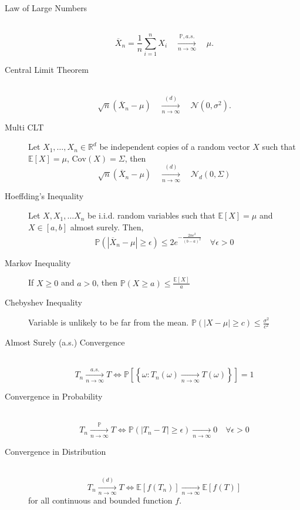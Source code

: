 \documentclass[a4paper, 10pt,landscape]{article}
\newcommand{\cov}{\textrm{Cov}}
\begin{document}
\begin{multicols*}{3}
\begin{description}
	\item[Law of Large Numbers] ~
	\begin{equation*}
	\overline{X}_n=\frac{1}{n}\sum_{i=1}^{n}X_i\quad\xrightarrow[n\rightarrow\infty]{\mathbb{P}, a.s.}\quad\mu.
	\end{equation*}
	\item[Central Limit Theorem] ~
	$$\sqrt{n}\left(\overline{X}_n-\mu\right)\quad\xrightarrow[n\rightarrow\infty]{(d)}\quad\mathcal{N}\left(0,\sigma^2\right).$$
	\item[Multi CLT]  Let $X_1,\dots,X_n\in\mathbb{R}^d$ be independent copies of a random vector $X$ such that $\mathbb{E}\left[X\right]=\mu$, $\cov\left(X\right)=\Sigma$, then
	$$\sqrt{n}\left(\overline{X}_n-\mu\right)\quad\xrightarrow[n\rightarrow\infty]{(d)}\quad\mathcal{N}_d\left(0,\Sigma\right)$$	
	\item[Hoeffding's Inequality] Let $X, X_1,\dots X_n$ be i.i.d. random variables such that $\mathbb{E}\left[X\right]=\mu$ and $X\in\left[a,b\right]$ almost surely. Then, \begin{equation*}
		\mathbb{P}\left(\left|\overline{X}_n-\mu\right|\geq\epsilon\right)\leq2e^{-\frac{2n\epsilon^2}{(b-a)^2}}\quad\forall\epsilon>0
	\end{equation*}
	\item[Markov Inequality] If $X \geq 0$ and $a > 0$, then $\mathbb{P} (X\geq a) \leq \frac{\mathbb{E}[X]}{a}$
	\item[Chebyshev Inequality] Variable is unlikely to be far from the mean. $\mathbb{P}(|X-\mu| \geq c) \leq \frac{\sigma^2}{c^2}$
\end{description}


\begin{description}
	\item[Almost Surely (a.s.) Convergence] ~
	\begin{equation*}
		T_n\xrightarrow[n\rightarrow\infty]{a.s.}T\iff\mathbb{P}\left[\left\{\omega:T_n(\omega)\xrightarrow[n\rightarrow\infty]{}T(\omega)\right\}\right]=1
	\end{equation*}
	\item[Convergence in Probability] ~
	\begin{equation*}
		T_n\xrightarrow[n\rightarrow\infty]{\mathbb{P}}T\iff\mathbb{P}\left(\left|T_n-T\right|\geq\epsilon\right)\xrightarrow[n\rightarrow\infty]{}0\quad\forall\epsilon>0
	\end{equation*}
	\item[Convergence in Distribution] ~
	\begin{equation*}
	T_n\xrightarrow[n\rightarrow\infty]{(d)}T\iff\mathbb{E}\left[f\left(T_n\right)\right]\xrightarrow[n\rightarrow\infty]{}\mathbb{E}\left[f\left(T\right)\right]
	\end{equation*}
	for all continuous and bounded function $f$.
\end{description}


\end{multicols*}
\end{document}
